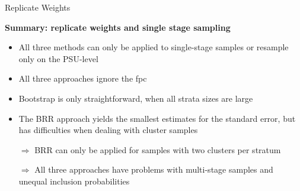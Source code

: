 \documentclass[11pt,german,hideothersubsections]{beamer}
\begin{document}
\begin{frame}[fragile]{Replicate Weights}
\footnotesize{
\begin{center}
\textbf{Summary: replicate weights and single stage sampling}
\end{center}
\begin{itemize}
\item All three methods can only be applied to single-stage samples or resample only on the PSU-level
\item All three approaches ignore the fpc
\pause\item Bootstrap is only straightforward, when all strata sizes are large
\pause\item The BRR approach yields the smallest estimates for the standard error, but has difficulties when dealing with cluster samples
\pause\item[$\Rightarrow$] BRR can only be applied for samples with two clusters per stratum
\pause\item[$\Rightarrow$] All three approaches have problems with multi-stage samples and unequal inclusion probabilities 

\end{itemize}
}
\end{frame}
\end{document}
